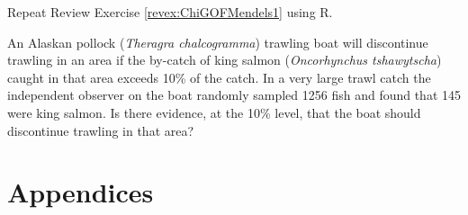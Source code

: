\documentclass[10pt,openany]{book}\usepackage[]{graphicx}\usepackage[]{color}
\begin{document}
\begin{exsection}
  \item \label{revex:ChiGOFMendels1R} \rhw{} Repeat Review Exercise \ref{revex:ChiGOFMendels1} using R. 

  \item \label{revex:ChiGOFByCatch} \rhw{} An Alaskan pollock (\textit{Theragra chalcogramma}) trawling boat will discontinue trawling in an area if the by-catch of king salmon (\textit{Oncorhynchus tshawytscha}) caught in that area exceeds 10\% of the catch.  In a very large trawl catch the independent observer on the boat randomly sampled 1256 fish and found that 145 were king salmon.  Is there evidence, at the 10\% level, that the boat should discontinue trawling in that area? 
\end{exsection}

    \cleardoublepage
    \chapter*{Appendices}
    \appendix
    
    




  \backmatter
    
\end{document}

